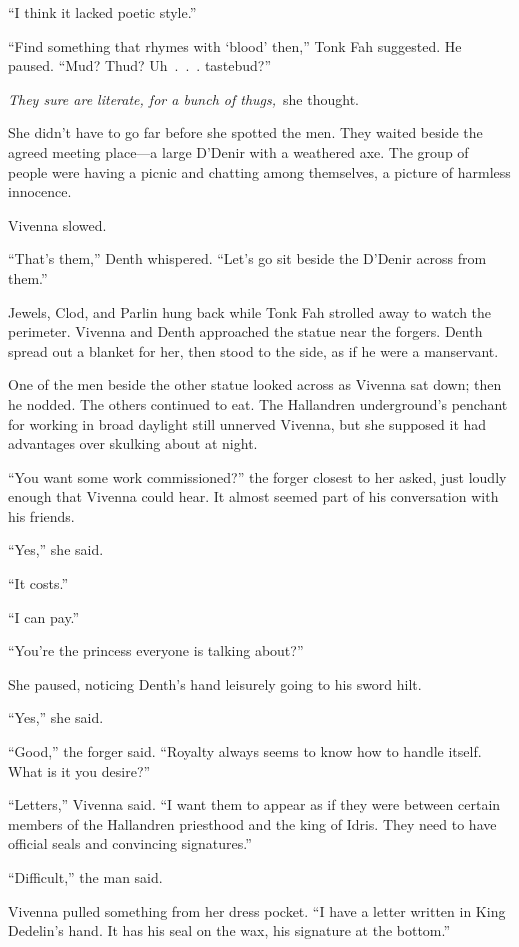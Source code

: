 “I think it lacked poetic style.”

“Find something that rhymes with ‘blood’ then,” Tonk Fah suggested. He paused. “Mud? Thud? Uh~.~.~. tastebud?”

\textit{They sure are literate, for a bunch of thugs,}~she thought.

She didn’t have to go far before she spotted the men. They waited beside the agreed meeting place—a large D’Denir with a weathered axe. The group of people were having a picnic and chatting among themselves, a picture of harmless innocence.

Vivenna slowed.

“That’s them,” Denth whispered. “Let’s go sit beside the D’Denir across from them.”

Jewels, Clod, and Parlin hung back while Tonk Fah strolled away to watch the perimeter. Vivenna and Denth approached the statue near the forgers. Denth spread out a blanket for her, then stood to the side, as if he were a manservant.

One of the men beside the other statue looked across as Vivenna sat down; then he nodded. The others continued to eat. The Hallandren underground’s penchant for working in broad daylight still unnerved Vivenna, but she supposed it had advantages over skulking about at night.

“You want some work commissioned?” the forger closest to her asked, just loudly enough that Vivenna could hear. It almost seemed part of his conversation with his friends.

“Yes,” she said.

“It costs.”

“I can pay.”

“You’re the princess everyone is talking about?”

She paused, noticing Denth’s hand leisurely going to his sword hilt.

“Yes,” she said.

“Good,” the forger said. “Royalty always seems to know how to handle itself. What is it you desire?”

“Letters,” Vivenna said. “I want them to appear as if they were between certain members of the Hallandren priesthood and the king of Idris. They need to have official seals and convincing signatures.”

“Difficult,” the man said.

Vivenna pulled something from her dress pocket. “I have a letter written in King Dedelin’s hand. It has his seal on the wax, his signature at the bottom.”

